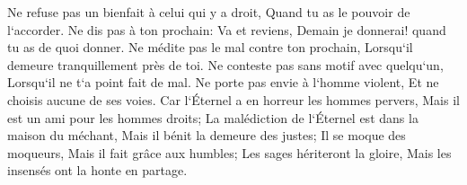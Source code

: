 \verse Ne refuse pas un bienfait à celui qui y a droit, Quand tu as le pouvoir de l`accorder. 
\verse Ne dis pas à ton prochain: Va et reviens, Demain je donnerai! quand tu as de quoi donner. 
\verse Ne médite pas le mal contre ton prochain, Lorsqu`il demeure tranquillement près de toi. 
\verse Ne conteste pas sans motif avec quelqu`un, Lorsqu`il ne t`a point fait de mal. 
\verse Ne porte pas envie à l`homme violent, Et ne choisis aucune de ses voies. 
\verse Car l`Éternel a en horreur les hommes pervers, Mais il est un ami pour les hommes droits; 
\verse La malédiction de l`Éternel est dans la maison du méchant, Mais il bénit la demeure des justes; 
\verse Il se moque des moqueurs, Mais il fait grâce aux humbles; 
\verse Les sages hériteront la gloire, Mais les insensés ont la honte en partage. 

\chapter{}

